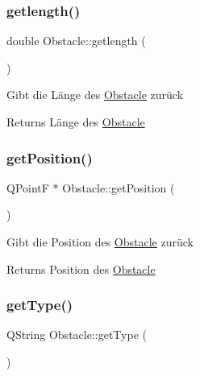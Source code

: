 \mbox{\label{class_obstacle_afe853d8607d0794e44d3507c47ad5761}} 
\subsubsection{\texorpdfstring{getlength()}{getlength()}}
{\footnotesize\ttfamily double Obstacle\+::getlength (\begin{DoxyParamCaption}{ }\end{DoxyParamCaption})}

Gibt die Länge des \mbox{\hyperlink{class_obstacle}{Obstacle}} zurück \begin{DoxyReturn}{Returns}
Länge des \mbox{\hyperlink{class_obstacle}{Obstacle}} 
\end{DoxyReturn}
\mbox{\label{class_obstacle_acc23c6ded38190d10b50e6190a85744e}} 
\subsubsection{\texorpdfstring{get\+Position()}{getPosition()}}
{\footnotesize\ttfamily Q\+PointF $\ast$ Obstacle\+::get\+Position (\begin{DoxyParamCaption}{ }\end{DoxyParamCaption})}

Gibt die Position des \mbox{\hyperlink{class_obstacle}{Obstacle}} zurück \begin{DoxyReturn}{Returns}
Position des \mbox{\hyperlink{class_obstacle}{Obstacle}} 
\end{DoxyReturn}
\mbox{\label{class_obstacle_a14ba5e7996c9e0a0bd3afc3bea5771ea}} 
\subsubsection{\texorpdfstring{get\+Type()}{getType()}}
{\footnotesize\ttfamily Q\+String Obstacle\+::get\+Type (\begin{DoxyParamCaption}{ }\end{DoxyParamCaption})\hspace{0.3cm}{\ttfamily [virtual]}}

